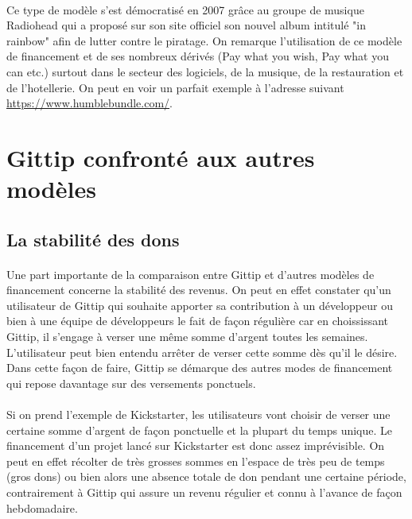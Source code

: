     \paragraph{} Ce type de modèle s'est démocratisé en 2007 grâce au groupe de
    musique Radiohead qui a proposé sur son site officiel son nouvel album
    intitulé "in rainbow" afin de lutter contre le piratage. On remarque
    l'utilisation de ce modèle de financement et de ses nombreux dérivés (Pay
    what you wish, Pay what you can etc.) surtout dans le secteur des
    logiciels, de la musique, de la restauration et de l'hotellerie. On peut en
    voir un parfait exemple à l'adresse suivant
    \url{https://www.humblebundle.com/}.


\section{Gittip confronté aux autres modèles}

\subsection{La stabilité des dons}

\paragraph{}
Une part importante de la comparaison entre Gittip et d'autres modèles de
financement concerne la stabilité des revenus. On peut en effet constater qu'un
utilisateur de Gittip qui souhaite apporter sa contribution à un développeur ou
bien à une équipe de développeurs le fait de façon régulière car en
choississant
Gittip, il s'engage à verser une même somme d'argent toutes les semaines.
L'utilisateur peut bien entendu arrêter de verser cette somme dès qu'il le
désire. Dans cette façon de faire, Gittip se démarque des autres modes de
financement qui repose davantage sur des versements ponctuels.

\paragraph{}
Si on prend l'exemple de Kickstarter, les utilisateurs vont choisir de verser
une certaine somme d'argent de façon ponctuelle et la plupart du temps unique.
Le financement d'un projet lancé sur Kickstarter est donc assez imprévisible.
On peut en effet récolter de très grosses sommes en l'espace de très peu de
temps
(gros dons) ou bien alors une absence totale de don pendant une certaine
période, contrairement à Gittip qui assure un revenu régulier et connu à
l'avance de façon hebdomadaire.

